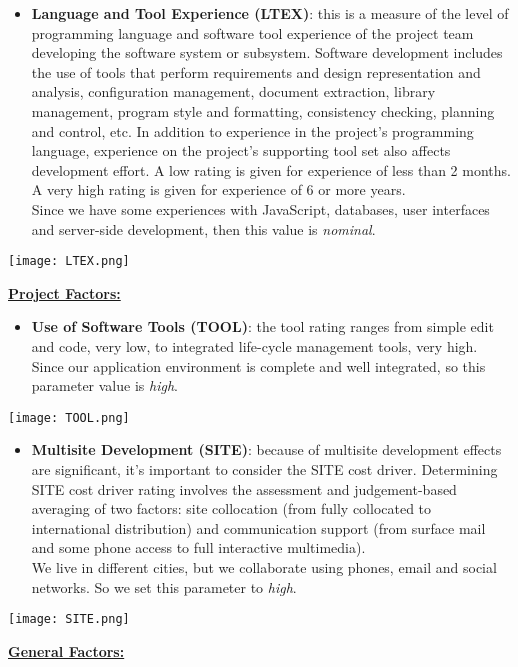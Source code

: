 \begin{itemize}
	\item \textbf{Language and Tool Experience (LTEX)}: this is a measure of the level of programming language and software tool experience of the project team developing the software system or subsystem. Software development includes the use of tools that perform requirements and design representation and analysis, configuration management, document extraction, library management, program style and formatting,
	consistency checking, planning and control, etc. In addition to experience in the project’s	programming language, experience on the project’s supporting tool set also affects development effort. A low rating is given for experience of less than 2 months. A very high rating is given for experience of 6 or more years. \\ Since we have some experiences with JavaScript, databases, user interfaces and server-side development, then this value is \textit{nominal}.
\end{itemize}
\begin{center}
	\texttt{[image: LTEX.png]}
\end{center}
\textbf{\underline{Project Factors:}}

\begin{itemize}
	\item \textbf{Use of Software Tools (TOOL)}: the tool rating ranges from simple edit and code, very low, to integrated life-cycle management tools, very high. \\ Since our application environment is complete and well integrated, so this parameter value is \textit{high}.
\end{itemize}
\begin{center}
	\texttt{[image: TOOL.png]}
\end{center}

\begin{itemize}
	\item \textbf{Multisite Development (SITE)}: because of multisite development effects are significant, it's important to consider the SITE cost driver. Determining SITE cost driver rating involves the assessment and judgement-based averaging of two factors: site collocation (from fully collocated to international distribution) and communication	support (from surface mail and some phone access to full interactive multimedia). \\ We live in different cities, but we collaborate using phones, email and social networks. So we set this parameter to \textit{high}.
\end{itemize}
\begin{center}
	\texttt{[image: SITE.png]}
\end{center}
\textbf{\underline{General Factors:}}


